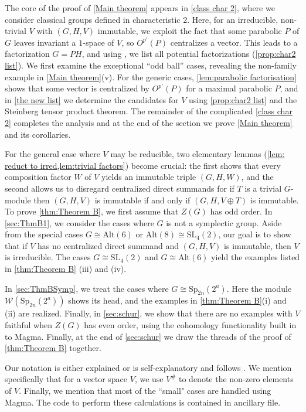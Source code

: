 \documentclass[12pt]{amsart}
\theoremstyle{remark}
\theoremstyle{notation}
\theoremstyle{definition}
\newcommand{\Sp}{\mathrm{Sp}}
\newcommand{\SL}{\mathrm{SL}}
\newcommand{\0}{\emptyset}
\newcommand{\Alt}{\mathrm{Alt}}
\begin{document}
The core of the proof of \cref{Main theorem} appears in \cref{class char 2}, where we consider classical groups defined in characteristic $2$.
Here, for an irreducible, non-trivial $V$ with $(G,H,V)$ immutable, we exploit the fact that some   parabolic $P$ of $G$ leaves invariant a $1$-space of $V$, so $O^{p'}(P)$ centralizes a vector.
This leads to a factorization $G = PH$, and using \cite{LiebeckPraegerSaxl}, we list all potential factorizations (\cref{prop:char2 list}).
We first examine the exceptional “odd ball” cases, revealing the non-family example in \cref{Main theorem}(v).
For the generic cases, \cref{lem:parabolic factorisation} shows that some vector is centralized by $O^{p'}(P)$ for a maximal parabolic $P$, and in \cref{the new list} we determine the candidates for $V$ using \cref{prop:char2 list} and the Steinberg tensor product theorem.
The remainder of the complicated \cref{class char 2} completes the analysis and at the end of the section we prove \cref{Main theorem} and its corollaries.

For the general case where $V$ may be reducible, two elementary lemmas (\cref{lem: reduct to irred,lem:trivial factors}) become crucial: the first shows that every composition factor $W$ of $V$ yields an immutable triple $(G,H,W)$, and the second allows us to disregard centralized direct summands for if $T$ is a trivial $G$-module then $(G,H,V)$ is immutable if and only if $(G,H,V\oplus T)$ is immutable.
To prove \cref{thm:Theorem B}, we first assume that $Z(G)$ has odd order.
In \cref{sec:ThmB1}, we consider the cases where $G$ is not a symplectic group.
Aside from the special cases $G \cong \Alt(6)$ or $\Alt(8) \cong \SL_4(2)$, our goal is to show that if $V$ has no centralized direct summand and $(G,H,V)$ is immutable, then $V$ is irreducible.
The cases $G \cong \SL_4(2)$ and $G \cong \Alt(6)$ yield the examples listed in \cref{thm:Theorem B} (iii) and (iv).

In \cref{sec:ThmBSymp}, we treat the cases where $G \cong \Sp_{2n}(2^a)$.
Here the module $\mathcal W(\Sp_{2n}(2^a))$ shows its head, and the examples in \cref{thm:Theorem B}(i) and (ii) are realized.
Finally, in \cref{sec:schur}, we show that there are no examples with $V$ faithful when $Z(G)$ has even order, using the cohomology functionality built in to {\sc Magma}. Finally, at the end of
\cref{sec:schur} we draw the threads of the proof of  \cref{thm:Theorem B} together.


 Our notation is either explained or is self-explanatory and follows \cite{AschbacherFG}.   We mention specifically that for a vector space $V$, we use $V^\#$ to denote the non-zero elements of $V$.
Finally, we mention that most of the ``small" cases are handled using {\sc Magma}. The code to perform these calculations is contained in ancillary  file.
\end{document}

